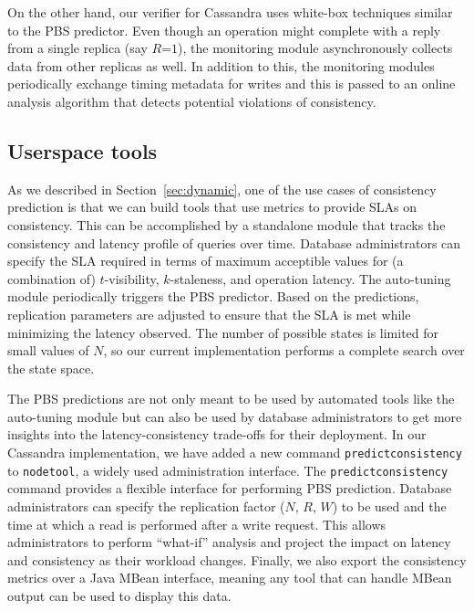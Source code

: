 On the other hand, our verifier for Cassandra uses white-box techniques similar
to the PBS predictor. Even though an operation might complete with a reply
from a single replica (say $R$=$1$), the monitoring module asynchronously collects 
data from other replicas as well. In addition to this, the monitoring modules
periodically exchange timing metadata for writes and this is passed to an online
analysis algorithm that detects potential violations of consistency.

\subsection{Userspace tools}


As we described in Section~\ref{sec:dynamic}, one of the use cases of
consistency prediction is that we can build tools that use metrics to
provide SLAs on consistency. This can be accomplished by a standalone
module that tracks the consistency and latency profile of queries over
time. Database administrators can specify the SLA required in terms of
maximum acceptible values for (a combination of) $t$-visibility,
$k$-staleness, and operation latency. The auto-tuning module
periodically triggers the PBS predictor. Based on the predictions,
replication parameters are adjusted to ensure that the SLA is met
while minimizing the latency observed. The number of possible states
is limited for small values of $N$, so our current implementation
performs a complete search over the state space.

The PBS predictions are not only meant to be used by automated tools
like the auto-tuning module but can also be used by database administrators
to get more insights into the latency-consistency trade-offs for their
deployment. In our Cassandra implementation, we have added a new
command \texttt{predictconsistency} to \texttt{nodetool}, a widely
used administration interface.  The \texttt{predictconsistency}
command provides a flexible interface for performing PBS
prediction. Database administrators can specify the replication factor
($N$, $R$, $W$) to be used and the time at which a read is performed
after a write request. This allows administrators to perform ``what-if''
analysis and project the impact on latency and consistency as their
workload changes.  Finally, we also export the consistency metrics
over a Java MBean interface, meaning any tool that can handle MBean
output can be used to display this data.


